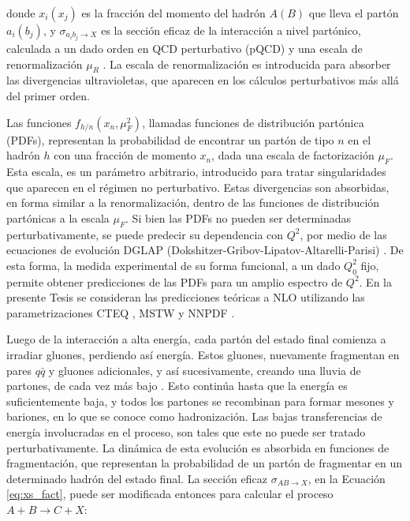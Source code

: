 donde $x_i(x_j)$ es la fracción del momento del hadrón $A(B)$ que lleva el partón $a_i(b_j)$, y $\sigma_{a_i b_j \to X}$ es la sección eficaz de la interacción a nivel partónico, calculada a un dado orden en QCD perturbativo (pQCD) y una escala de renormalización $\mu_R$ \cite{Tripiana:1433788,Wahlberg:2005gi}. La escala de renormalización es introducida
para absorber las divergencias ultravioletas, que aparecen en los cálculos perturbativos más
allá del primer orden.

Las funciones $f_{h/n}(x_{n}, \mu_{F}^2)$, llamadas funciones de distribución partónica (PDFs), representan la probabilidad de encontrar un partón de tipo $n$ en el hadrón $h$ con una fracción de
momento $x_n$, dada una escala de factorización $\mu_{F}$. Esta escala, es un parámetro arbitrario,
introducido para tratar singularidades que aparecen en el régimen no perturbativo. Estas
divergencias son absorbidas, en forma similar a la renormalización, dentro de las funciones
de distribución partónicas a la escala $\mu_F$. Si bien las PDFs no pueden ser determinadas
perturbativamente, se puede predecir su dependencia con $Q^2$, por medio de las ecuaciones
de evolución DGLAP (Dokshitzer-Gribov-Lipatov-Altarelli-Parisi) \cite{GRIBOV197178,Lipatov:1974qm,altarelli-parisi}. De esta forma, la
medida experimental de su forma funcional, a un dado $Q^2_0$ fijo, permite obtener predicciones
de las PDFs para un amplio espectro de $Q^2$. En la presente Tesis se consideran las predicciones teóricas a NLO utilizando las parametrizaciones CTEQ \cite{Lai:1999wy,Pumplin:2002vw}, MSTW \cite{Martin:2009iq, Martin:2009bu, Martin_2010} y NNPDF \cite{Ball:2012cx,Ball:2014uwa}.

Luego de la interacción a alta energía, cada partón del estado final comienza a irradiar gluones,
perdiendo así energía. Estos gluones, nuevamente fragmentan en pares $q\bar{q}$ y gluones adicionales, y así sucesivamente, creando una lluvia de partones, de cada vez más bajo \pt. Esto continúa hasta
que la energía es suficientemente baja, y todos los partones se recombinan para formar
mesones y bariones, en lo que se conoce como hadronización. Las bajas transferencias de
energía involucradas en el proceso, son tales que este no puede ser tratado perturbativamente. La dinámica de esta evolución es absorbida en funciones de fragmentación, que
representan la probabilidad de un partón de fragmentar en un determinado hadrón del
estado final. La sección eficaz $\sigma_{AB\to X}$, en la Ecuación \ref{eq:xs_fact}, puede ser modificada entonces para
calcular el proceso $A + B \to C + X$:




